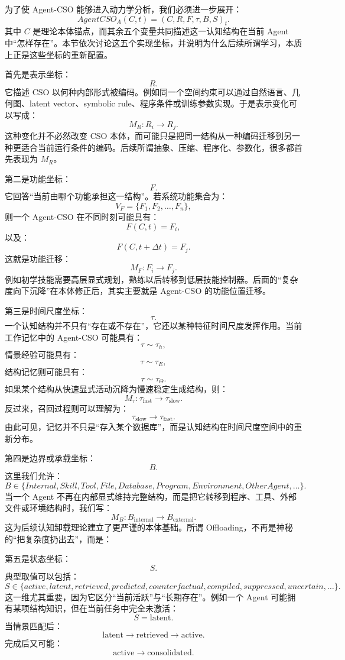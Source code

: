 为了使 Agent-CSO 能够进入动力学分析，我们必须进一步展开：
\[
AgentCSO_A(C,t)
=
(C,R,F,\tau,B,S)_t.
\]
其中 $C$ 是理论本体锚点，而其余五个变量共同描述这一认知结构在当前 Agent 中“怎样存在”。本节依次讨论这五个实现坐标，并说明为什么后续所谓学习，本质上正是这些坐标的重新配置。

首先是表示坐标：
\[
R.
\]
它描述 CSO 以何种内部形式被编码。例如同一个空间约束可以通过自然语言、几何图、latent vector、symbolic rule、程序条件或训练参数实现。于是表示变化可以写成：
\[
M_R:
R_i
\rightarrow
R_j.
\]
这种变化并不必然改变 CSO 本体，而可能只是把同一结构从一种编码迁移到另一种更适合当前运行条件的编码。后续所谓抽象、压缩、程序化、参数化，很多都首先表现为 $M_R$。

第二是功能坐标：
\[
F.
\]
它回答“当前由哪个功能承担这一结构”。若系统功能集合为：
\[
V_F
=
\{F_1,F_2,\ldots,F_n\},
\]
则一个 Agent-CSO 在不同时刻可能具有：
\[
F(C,t)=F_i,
\]
以及：
\[
F(C,t+\Delta t)=F_j.
\]
这就是功能迁移：
\[
M_F:
F_i
\rightarrow
F_j.
\]
例如初学技能需要高层显式规划，熟练以后转移到低层技能控制器。后面的“复杂度向下沉降”在本体修正后，其实主要就是 Agent-CSO 的功能位置迁移。

第三是时间尺度坐标：
\[
\tau.
\]
一个认知结构并不只有“存在或不存在”，它还以某种特征时间尺度发挥作用。当前工作记忆中的 Agent-CSO 可能具有：
\[
\tau\sim \tau_h,
\]
情景经验可能具有：
\[
\tau\sim\tau_E,
\]
结构记忆则可能具有：
\[
\tau\sim\tau_\Theta.
\]
如果某个结构从快速显式活动沉降为慢速稳定生成结构，则：
\[
M_\tau:
\tau_{\text{fast}}
\rightarrow
\tau_{\text{slow}}.
\]
反过来，召回过程则可以理解为：
\[
\tau_{\text{slow}}
\rightarrow
\tau_{\text{fast}}.
\]
由此可见，记忆并不只是“存入某个数据库”，而是认知结构在时间尺度空间中的重新分布。

第四是边界或承载坐标：
\[
B.
\]
这里我们允许：
\[
B
\in
\{
Internal,
Skill,
Tool,
File,
Database,
Program,
Environment,
OtherAgent,
\ldots
\}.
\]
当一个 Agent 不再在内部显式维持完整结构，而是把它转移到程序、工具、外部文件或环境结构时，我们写：
\[
M_B:
B_{\text{internal}}
\rightarrow
B_{\text{external}}.
\]
这为后续认知卸载理论建立了更严谨的本体基础。所谓 Offloading，不再是神秘的“把复杂度扔出去”，而是：
\begin{statementbox}
\centering
{}
\end{statementbox}

第五是状态坐标：
\[
S.
\]
典型取值可以包括：
\[
S
\in
\{
active,
latent,
retrieved,
predicted,
counterfactual,
compiled,
suppressed,
uncertain,
\ldots
\}.
\]
这一维尤其重要，因为它区分“当前活跃”与“长期存在”。例如一个 Agent 可能拥有某项结构知识，但在当前任务中完全未激活：
\[
S=\text{latent}.
\]
当情景匹配后：
\[
\text{latent}
\rightarrow
\text{retrieved}
\rightarrow
\text{active}.
\]
完成后又可能：
\[
\text{active}
\rightarrow
\text{consolidated}.
\]


